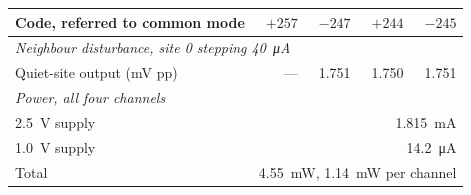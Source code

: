 {\begin{tabular}{lrrrr}
    Code, referred to common mode   & \(+257\) & \(-247\) & \(+244\) & \(-245\) \\
    \midrule
    \multicolumn{5}{l}{\emph{Neighbour disturbance, site 0 stepping \SI{40}{\micro\ampere}}} \\
    Quiet-site output (\si{\milli\volt} pp) & --- & 1.751 & 1.750 & 1.751 \\
    \midrule
    \multicolumn{5}{l}{\emph{Power, all four channels}} \\
    \SI{2.5}{\volt} supply          & \multicolumn{4}{r}{\SI{1.815}{\milli\ampere}} \\
    \SI{1.0}{\volt} supply          & \multicolumn{4}{r}{\SI{14.2}{\micro\ampere}} \\
    Total                           & \multicolumn{4}{r}{\SI{4.55}{\milli\watt}, \SI{1.14}{\milli\watt} per channel} \\
    \bottomrule
  \end{tabular}%
}
\par\addvspace{\intextsep}
